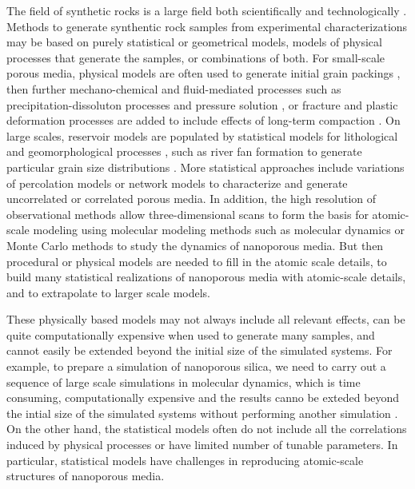 \documentclass[aps,pre,twocolumn,letterpaper,floatfix,showpacs]{revtex4}
\begin{document}
The field of synthetic rocks is a large field both scientifically and technologically \citep{biswal2007stochastic,hamzehpour2006development, yeong1998reconstructing}. 
Methods to generate synthentic rock samples from experimental characterizations may be based on purely statistical or geometrical models, models of physical processes that generate the samples, or combinations of both. 
For small-scale porous media, physical models are often used to generate initial grain packings \cite{pilotti1998generation,scott1969density,herrmann2013physics}, then further mechano-chemical and fluid-mediated processes such as precipitation-dissoluton processes and pressure solution \cite{rutter1983pressure}, or fracture and plastic deformation processes are added to include effects of long-term compaction \cite{rutter1983pressure,renard1997pressure}. 
On large scales, reservoir models are populated by statistical models for lithological and geomorphological processes \cite{pyrcz2014geostatistical}, such as river fan formation to generate particular grain size distributions \cite{koltermann1996heterogeneity,blair1994alluvial}. 
More statistical approaches include variations of percolation models \cite{sahimi} or network models \cite{fatt1956network,sahimi1993flow} to characterize and generate uncorrelated or correlated porous media. 
In addition, the high resolution of observational methods allow three-dimensional scans to form the basis for atomic-scale modeling using molecular modeling methods such as molecular dynamics or Monte Carlo methods to study the dynamics of nanoporous media. 
But then procedural or physical models are needed to fill in the atomic scale details, to build many statistical realizations of nanoporous media with atomic-scale details, and to extrapolate to larger scale models.

These physically based models may not always include all relevant effects, can be quite computationally expensive when used to generate many samples, and cannot easily be extended beyond the initial size of the simulated systems. 
For example, to prepare a simulation of nanoporous silica, we need to carry out a sequence of large scale simulations in molecular dynamics, which is time consuming, computationally expensive and the results canno be exteded beyond the intial size of the simulated systems without performing another simulation \cite{Adarsh}. 
On the other hand, the statistical models often do not include all the correlations induced by physical processes or have limited number of tunable parameters. 
In particular, statistical models have challenges in reproducing atomic-scale structures of nanoporous media. 
\end{document}
